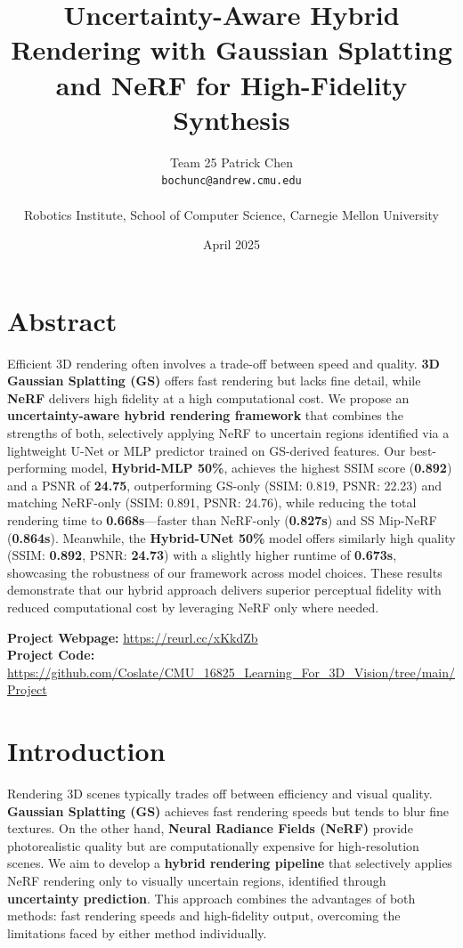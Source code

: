 \documentclass[10pt,letterpaper]{article}
\title{
	\Large{\textbf{Uncertainty-Aware Hybrid Rendering with Gaussian
			Splatting and NeRF for High-Fidelity Synthesis}}
}
\date{\small April 2025}
\author{
	Team 25 Patrick Chen\\
	\small\texttt{bochunc@andrew.cmu.edu}	\\\\
	\large Robotics Institute, School of Computer Science, Carnegie Mellon University
}
\begin{document}
	
	\maketitle
	\thispagestyle{empty}
\section*{Abstract}
\noindent Efficient 3D rendering often involves a trade-off between speed and quality. \textbf{3D Gaussian Splatting (GS)} offers fast rendering but lacks fine detail, while \textbf{NeRF} delivers high fidelity at a high computational cost. We propose an \textbf{uncertainty-aware hybrid rendering framework} that combines the strengths of both, selectively applying NeRF to uncertain regions identified via a lightweight U-Net or MLP predictor trained on GS-derived features. Our best-performing model, \textbf{Hybrid-MLP 50\%}, achieves the highest SSIM score (\textbf{0.892}) and a PSNR of \textbf{24.75}, outperforming GS-only (SSIM: 0.819, PSNR: 22.23) and matching NeRF-only (SSIM: 0.891, PSNR: 24.76), while reducing the total rendering time to \textbf{0.668s}—faster than NeRF-only (\textbf{0.827s}) and SS Mip-NeRF (\textbf{0.864s}). Meanwhile, the \textbf{Hybrid-UNet 50\%} model offers similarly high quality (SSIM: \textbf{0.892}, PSNR: \textbf{24.73}) with a slightly higher runtime of \textbf{0.673s}, showcasing the robustness of our framework across model choices. These results demonstrate that our hybrid approach delivers superior perceptual fidelity with reduced computational cost by leveraging NeRF only where needed.






\noindent\textbf{Project Webpage:} \url{https://reurl.cc/xKkdZb} \\
\noindent\textbf{Project Code:} \url{https://github.com/Coslate/CMU_16825_Learning_For_3D_Vision/tree/main/Project}

\newpage


\section{Introduction}

Rendering 3D scenes typically trades off between efficiency and visual quality. \textbf{Gaussian Splatting (GS)} achieves fast rendering speeds but tends to blur fine textures. On the other hand, \textbf{Neural Radiance Fields (NeRF)} provide photorealistic quality but are computationally expensive for high-resolution scenes. We aim to develop a \textbf{hybrid rendering pipeline} that selectively applies NeRF rendering only to visually uncertain regions, identified through \textbf{uncertainty prediction}. This approach combines the advantages of both methods: fast rendering speeds and high-fidelity output, overcoming the limitations faced by either method individually.
\end{document}
